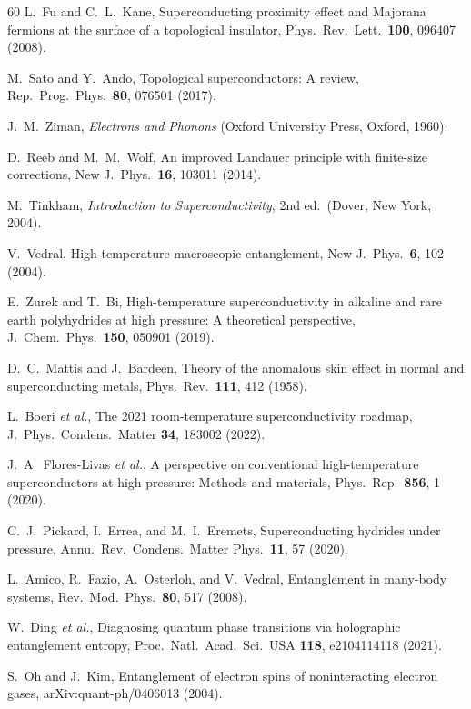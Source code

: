 \documentclass[prb,twocolumn,superscriptaddress,longbibliography,floatfix]{revtex4-2}
\begin{document}
\begin{thebibliography}{60}
L.~Fu and C.~L.~Kane,
Superconducting proximity effect and Majorana fermions at the surface
of a topological insulator,
Phys.\ Rev.\ Lett.\ \textbf{100}, 096407 (2008).

M.~Sato and Y.~Ando,
Topological superconductors: A review,
Rep.\ Prog.\ Phys.\ \textbf{80}, 076501 (2017).

J.~M.~Ziman,
\textit{Electrons and Phonons} (Oxford University Press, Oxford, 1960).

D.~Reeb and M.~M.~Wolf,
An improved Landauer principle with finite-size corrections,
New J.\ Phys.\ \textbf{16}, 103011 (2014).

M.~Tinkham,
\textit{Introduction to Superconductivity}, 2nd ed.\ (Dover, New York, 2004).

V.~Vedral,
High-temperature macroscopic entanglement,
New J.\ Phys.\ \textbf{6}, 102 (2004).

E.~Zurek and T.~Bi,
High-temperature superconductivity in alkaline and rare earth polyhydrides at high pressure:
A theoretical perspective,
J.\ Chem.\ Phys.\ \textbf{150}, 050901 (2019).

D.~C.~Mattis and J.~Bardeen,
Theory of the anomalous skin effect in normal and superconducting metals,
Phys.\ Rev.\ \textbf{111}, 412 (1958).

L.~Boeri \textit{et al.},
The 2021 room-temperature superconductivity roadmap,
J.\ Phys.\ Condens.\ Matter \textbf{34}, 183002 (2022).

J.~A.~Flores-Livas \textit{et al.},
A perspective on conventional high-temperature superconductors at high pressure:
Methods and materials,
Phys.\ Rep.\ \textbf{856}, 1 (2020).

C.~J.~Pickard, I.~Errea, and M.~I.~Eremets,
Superconducting hydrides under pressure,
Annu.\ Rev.\ Condens.\ Matter Phys.\ \textbf{11}, 57 (2020).

L.~Amico, R.~Fazio, A.~Osterloh, and V.~Vedral,
Entanglement in many-body systems,
Rev.\ Mod.\ Phys.\ \textbf{80}, 517 (2008).

W.~Ding \textit{et al.},
Diagnosing quantum phase transitions via holographic entanglement entropy,
Proc.\ Natl.\ Acad.\ Sci.\ USA \textbf{118}, e2104114118 (2021).

S.~Oh and J.~Kim,
Entanglement of electron spins of noninteracting electron gases,
arXiv:quant-ph/0406013 (2004).


\end{thebibliography}
\end{document}
